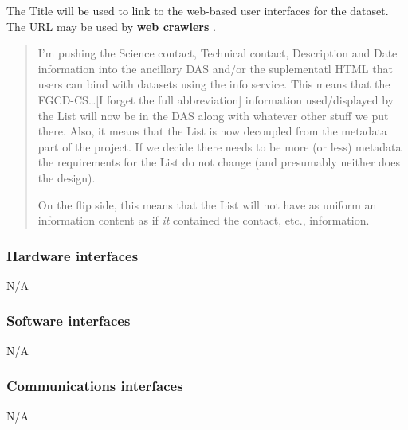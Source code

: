 \documentclass{article}
\begin{document}







  The Title will be used to link to the web-based user interfaces for the
  dataset. The URL may be used by \textbf{web crawlers}
  .

  \begin{quote}
    I'm pushing the Science contact, Technical contact, Description and Date
    information into the ancillary DAS and/or the suplementatl HTML that
    users can bind with datasets using the info service. This means that the
    FGCD-CS\ldots [I forget the full abbreviation] information used/displayed
    by the List will now be in the DAS along with whatever other stuff we put
    there. Also, it means that the List is now decoupled from the metadata
    part of the project. If we decide there needs to be more (or less)
    metadata the requirements for the List do not change (and presumably
    neither does the design).

    On the flip side, this means that the List will not have as uniform an
    information content as if \emph{it} contained the contact, etc.,
    information. 
  \end{quote}

\subsubsection{Hardware interfaces}
N/A
\subsubsection{Software interfaces}
N/A
\subsubsection{Communications interfaces}
N/A
\end{document}
